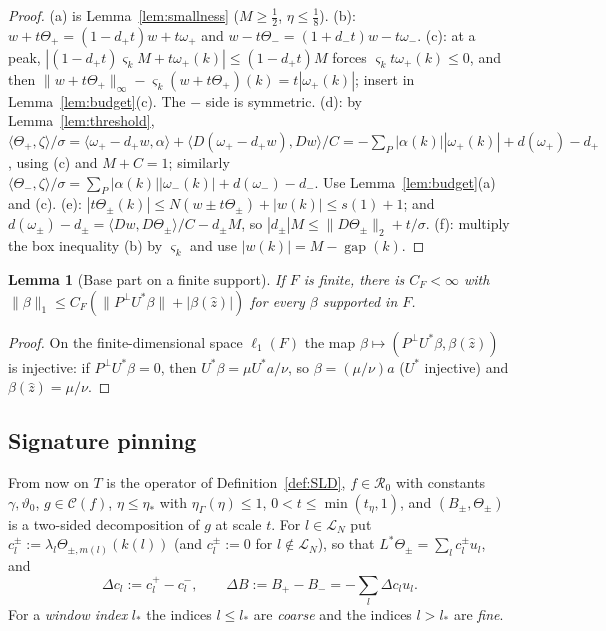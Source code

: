 \documentclass[10pt]{amsart}
\newtheorem{lemma}[theorem]{Lemma}
\theoremstyle{definition}
\theoremstyle{remark}
\newcommand{\Cset}{\mathcal C}
\newcommand{\gap}{\operatorname{gap}}
\newcommand{\zh}{\hat z}
\newcommand{\ip}[2]{\langle #1,#2\rangle}
\begin{document}
\begin{proof}
(a) is Lemma~\ref{lem:smallness} ($M\ge\frac12$, $\eta\le\frac18$).  (b):
$w+t\Theta_+=(1-d_+t)w+t\omega_+$ and $w-t\Theta_-=(1+d_-t)w-t\omega_-$.
(c): at a peak, $|(1-d_+t)\varsigma_kM+t\omega_+(k)|\le(1-d_+t)M$ forces
$\varsigma_kt\omega_+(k)\le0$, and then $\|w+t\Theta_+\|_\infty-\varsigma_k
(w+t\Theta_+)(k)=t|\omega_+(k)|$; insert in Lemma~\ref{lem:budget}(c).  The
$-$ side is symmetric.  (d): by Lemma~\ref{lem:threshold},
$\ip{\Theta_+}{\zeta}/\sigma=\ip{\omega_+-d_+w}{\alpha}+\ip{D(\omega_+-d_+w)}
{Dw}/C=-\sum_P|\alpha(k)||\omega_+(k)|+d(\omega_+)-d_+$, using (c) and
$M+C=1$; similarly $\ip{\Theta_-}{\zeta}/\sigma=\sum_P|\alpha(k)||
\omega_-(k)|+d(\omega_-)-d_-$.  Use Lemma~\ref{lem:budget}(a) and (c).
(e): $|t\Theta_\pm(k)|\le N(w\pm t\Theta_\pm)+|w(k)|\le s(1)+1$; and
$d(\omega_\pm)-d_\pm=\ip{Dw}{D\Theta_\pm}/C-d_\pm M$, so $|d_\pm|M\le
\|D\Theta_\pm\|_2+t/\sigma$.  (f): multiply the box inequality (b) by
$\varsigma_k$ and use $|w(k)|=M-\gap(k)$.
\end{proof}

\begin{lemma}[Base part on a finite support]\label{lem:finitebase}
If $F$ is finite, there is $C_F<\infty$ with $\|\beta\|_1\le C_F(\|P^\perp
U^*\beta\|+|\beta(\zh)|)$ for every $\beta$ supported in $F$.
\end{lemma}

\begin{proof}
On the finite-dimensional space $\ell_1(F)$ the map $\beta\mapsto
(P^\perp U^*\beta,\beta(\zh))$ is injective: if $P^\perp U^*\beta=0$, then
$U^*\beta=\mu U^*a/\nu$, so $\beta=(\mu/\nu)a$ ($U^*$ injective) and
$\beta(\zh)=\mu/\nu$.
\end{proof}

\subsection{Signature pinning}
From now on $T$ is the operator of Definition~\ref{def:SLD}, $f\in
\mathcal R_0$ with constants $\gamma,\vartheta_0$, $g\in\Cset(f)$,
$\eta\le\eta_*$ with $\eta_\Gamma(\eta)\le1$, $0<t\le\min(t_\eta,1)$, and
$(B_\pm,\Theta_\pm)$ is a two-sided decomposition of $g$ at scale $t$.  For
$l\in\mathcal L_N$ put $c^\pm_l:=\lambda_l\Theta_{\pm,m(l)}(k(l))$ (and
$c^\pm_l:=0$ for $l\notin\mathcal L_N$), so that $L^*\Theta_\pm=
\sum_lc^\pm_lu_l$, and
\[
 \Delta c_l:=c^+_l-c^-_l,\qquad \Delta B:=B_+-B_-=-\sum_l\Delta c_lu_l .
\]
For a \emph{window index} $l_*$ the indices $l\le l_*$ are \emph{coarse}
and the indices $l>l_*$ are \emph{fine}.
\end{document}
